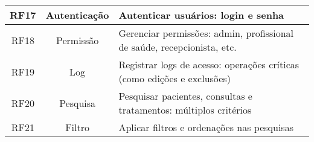 \begin{quadro}
\begin{tabular}{|c|c|p{10cm}|}
        RF17   & Autenticação & Autenticar usuários: login e senha \\ \hline
        RF18   & Permissão    & Gerenciar permissões: admin, profissional de saúde, recepcionista, etc. \\ \hline
        RF19   & Log          & Registrar logs de acesso: operações críticas (como edições e exclusões) \\ \hline
        RF20   & Pesquisa     & Pesquisar pacientes, consultas e tratamentos: múltiplos critérios \\ \hline
        RF21   & Filtro       & Aplicar filtros e ordenações nas pesquisas \\ \hline
    \end{tabular}
\end{quadro}
